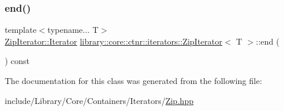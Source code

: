 \mbox{\label{classlibrary_1_1core_1_1ctnr_1_1iterators_1_1_zip_iterator_a91c3191909df9dcc737f14d9e38d9a78}} 
\subsubsection{\texorpdfstring{end()}{end()}}
{\footnotesize\ttfamily template$<$typename... T$>$ \\
\mbox{\hyperlink{classlibrary_1_1core_1_1ctnr_1_1iterators_1_1_zip_iterator_1_1_iterator}{Zip\+Iterator\+::\+Iterator}} \mbox{\hyperlink{classlibrary_1_1core_1_1ctnr_1_1iterators_1_1_zip_iterator}{library\+::core\+::ctnr\+::iterators\+::\+Zip\+Iterator}}$<$ T $>$\+::end (\begin{DoxyParamCaption}{ }\end{DoxyParamCaption}) const\hspace{0.3cm}{\ttfamily [inline]}}



The documentation for this class was generated from the following file\+:\begin{DoxyCompactItemize}
\item 
include/\+Library/\+Core/\+Containers/\+Iterators/\mbox{\hyperlink{_zip_8hpp}{Zip.\+hpp}}\end{DoxyCompactItemize}
